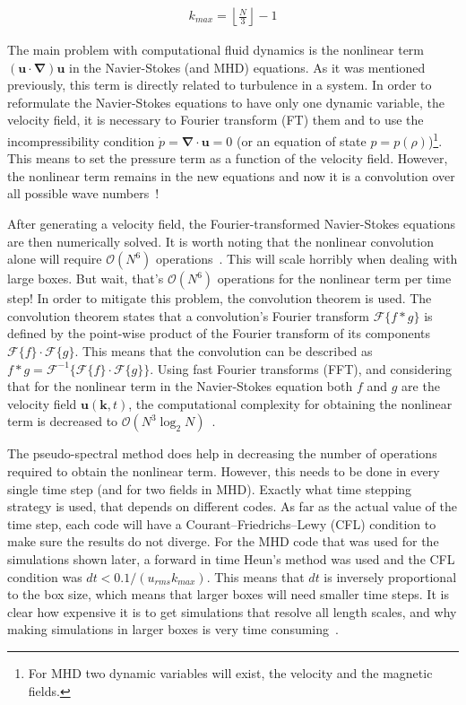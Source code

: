 \documentclass[12pt,a4paper]{report}
\begin{document}
\begin{align}
 k_{max} = \left\lfloor \frac{N}{3} \right\rfloor - 1
 \label{eq4.1}
\end{align}


The main problem with computational fluid dynamics is the nonlinear term $(\bm u \cdot \bm \nabla) \bm u$ in the Navier-Stokes (and MHD) equations. As it was mentioned previously, this term is directly related to turbulence in a system. In order to reformulate the Navier-Stokes equations to have only one dynamic variable, the velocity field, it is necessary to Fourier transform (FT) them and to use the incompressibility condition $\dot{p}=\bm \nabla \cdot \bm u = 0$ (or an equation of state $p=p(\rho)$)\footnote{For MHD two dynamic variables will exist, the velocity and the magnetic fields.}. This means to set the pressure term as a function of the velocity field. However, the nonlinear term remains in the new equations and now it is a convolution over all possible wave numbers~\cite{mccomb1990physics}!
 
After generating a velocity field, the Fourier-transformed Navier-Stokes equations are then numerically solved. It is worth noting that the nonlinear convolution alone will require $\mathcal{O}(N^6)$ operations~\cite{mccomb1990physics}. This will scale horribly when dealing with large boxes. But wait, that's $\mathcal{O}(N^6)$ operations for the nonlinear term per time step! In order to mitigate this problem, the convolution theorem is used. The convolution theorem states that a convolution's Fourier transform $\mathcal{F}\{f \ast g\}$ is defined by the point-wise product of the Fourier transform of its components $\mathcal{F}\{f\} \cdot \mathcal{F}\{g\}$. This means that the convolution can be described as $f \ast g = \mathcal{F}^{-1}\{ \mathcal{F}\{f\} \cdot \mathcal{F}\{g\} \}$. Using fast Fourier transforms (FFT), and considering that for the nonlinear term in the Navier-Stokes equation both $f$ and $g$ are the velocity field $\bm u (\bm k, t)$, the computational complexity for obtaining the nonlinear term is decreased to $\mathcal{O}(N^3 \log_2 N)$~\cite{mccomb1990physics}.

The pseudo-spectral method does help in decreasing the number of operations required to obtain the nonlinear term. However, this needs to be done in every single time step (and for two fields in MHD). Exactly what time stepping strategy is used, that depends on different codes. As far as the actual value of the time step, each code will have a Courant–Friedrichs–Lewy (CFL) condition to make sure the results do not diverge. For the MHD code that was used for the simulations shown later, a forward in time Heun's method was used and the CFL condition was $dt < 0.1/(u_{rms}k_{max})$. This means that $dt$ is inversely proportional to the box size, which means that larger boxes will need smaller time steps. It is clear how expensive it is to get simulations that resolve all length scales, and why making simulations in larger boxes is very time consuming~\cite{yoffe2013investigation, LinkmannMoritzFrederikLeon2016Spim}. 
\end{document}
